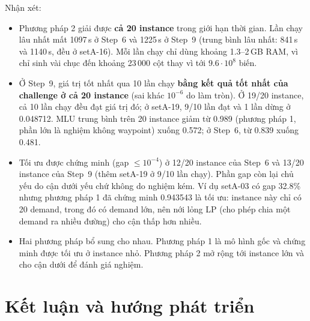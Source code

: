 \documentclass[11pt,a4paper]{article}
\begin{document}
Nhận xét:
\begin{itemize}
\item Phương pháp 2 giải được \textbf{cả 20 instance} trong giới hạn thời gian. Lần chạy lâu nhất mất 1097\,s ở Step~6 và 1225\,s ở Step~9 (trung bình lâu nhất: 841\,s và 1140\,s, đều ở setA-16). Mỗi lần chạy chỉ dùng khoảng 1.3--2\,GB RAM, vì chỉ sinh vài chục đến khoảng 23\,000 cột thay vì tới $9.6\cdot10^8$ biến.
\item Ở Step~9, giá trị tốt nhất qua 10 lần chạy \textbf{bằng kết quả tốt nhất của challenge ở cả 20 instance} (sai khác $10^{-6}$ do làm tròn). Ở 19/20 instance, cả 10 lần chạy đều đạt giá trị đó; ở setA-19, 9/10 lần đạt và 1 lần dừng ở 0.048712. MLU trung bình trên 20 instance giảm từ 0.989 (phương pháp 1, phần lớn là nghiệm không waypoint) xuống 0.572; ở Step~6, từ 0.839 xuống 0.481.
\item Tối ưu được chứng minh (gap $\le 10^{-4}$) ở 12/20 instance của Step~6 và 13/20 instance của Step~9 (thêm setA-19 ở 9/10 lần chạy). Phần gap còn lại chủ yếu do cận dưới yếu chứ không do nghiệm kém. Ví dụ setA-03 có gap 32.8\% nhưng phương pháp 1 đã chứng minh 0.943543 là tối ưu: instance này chỉ có 20 demand, trong đó có demand lớn, nên nới lỏng LP (cho phép chia một demand ra nhiều đường) cho cận thấp hơn nhiều.
\item Hai phương pháp bổ sung cho nhau. Phương pháp 1 là mô hình gốc và chứng minh được tối ưu ở instance nhỏ. Phương pháp 2 mở rộng tới instance lớn và cho cận dưới để đánh giá nghiệm.
\end{itemize}

\section{Kết luận và hướng phát triển}
\end{document}
